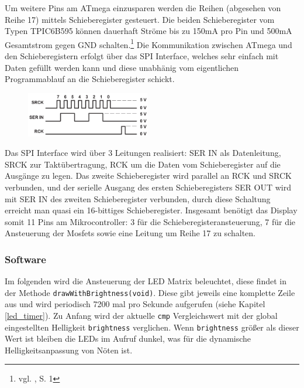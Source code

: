 Um weitere Pins am ATmega einzusparen werden die Reihen (abgesehen von Reihe 17)
mittels Schieberegister gesteuert. Die beiden Schieberegister vom Typen
TPIC6B595 können dauerhaft Ströme bis zu 150mA pro Pin und 500mA Gesamtstrom gegen GND
schalten.\footnote{vgl. \cite{6b595}, S. 1} Die Kommunikation zwischen ATmega
und den Schieberegistern erfolgt über das SPI Interface, welches sehr einfach mit Daten gefüllt werden kann und
diese unabhänig vom eigentlichen Programmablauf an die Schieberegister schickt.

\begin{figure}
  \vspace{-25pt}
  \begin{center}
    \includegraphics[width=0.48\textwidth]{skizzen/schieberegister_linien.png}
  \end{center}
  \vspace{-20pt}
\end{figure}

Das SPI Interface wird über 3 Leitungen realisiert: SER IN als Datenleitung,
SRCK zur Taktübertragung, RCK um die Daten vom Schieberegister auf die
Ausgänge zu legen. Das zweite Schieberegister wird parallel an RCK und SRCK
verbunden, und der serielle Ausgang des ersten Schieberegisters SER OUT wird mit
SER IN des zweiten Schieberegister verbunden, durch diese Schaltung erreicht man
quasi ein 16-bittiges Schieberegister.
Insgesamt benötigt das Display somit 11 Pins am Mikrocontroller: 3 für die
Schieberegisteransteuerung, 7 für die Ansteuerung der Mosfets sowie eine Leitung
um Reihe 17 zu schalten.
\subsubsection{Software}
Im folgenden wird die Ansteuerung der LED Matrix beleuchtet, diese findet in der
Methode \texttt{drawWithBrightness(void)}. Diese gibt jeweils eine komplette
Zeile aus und wird periodisch 7200 mal pro Sekunde aufgerufen (siehe
Kapitel \ref{led_timer}).
Zu Anfang wird der aktuelle \texttt{cmp} Vergleichswert mit der global eingestellten Helligkeit \texttt{brightness} verglichen. Wenn \texttt{brightness} größer als dieser Wert ist bleiben die LEDs
im Aufruf dunkel, was für die dynamische Helligkeitsanpassung von Nöten ist. 

